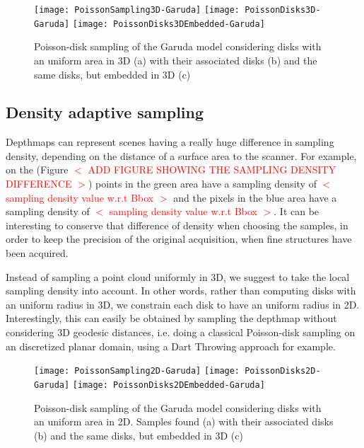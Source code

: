\documentclass[11pt,fleqn]{book} %
\newcommand{\arnaud}[1]{\textcolor{red}{$<$ #1 $>$}}
\begin{document}
\begin{figure}[ht]
\centering
\texttt{[image: PoissonSampling3D-Garuda]}
\texttt{[image: PoissonDisks3D-Garuda]}
\texttt{[image: PoissonDisks3DEmbedded-Garuda]}
\caption{Poisson-disk sampling of the Garuda model considering disks with an uniform area in 3D (a) with their associated disks (b) and the same disks, but embedded in 3D (c)}
\label{fig:poisson_sampling_3d}
\end{figure}

\subsection{Density adaptive sampling}
Depthmaps can represent scenes having a really huge difference in sampling density, depending on the distance of a surface area to the scanner. 
For example, on the (Figure \arnaud{ADD FIGURE SHOWING THE SAMPLING DENSITY DIFFERENCE}) points in the green area have a sampling density of \arnaud{sampling density value w.r.t Bbox} and the pixels in the blue area have a sampling density of \arnaud{sampling density value w.r.t Bbox}. It can be interesting to conserve that difference of density when choosing the samples, in order to keep the precision of the original acquisition, when fine structures have been acquired.

Instead of sampling a point cloud uniformly in 3D, we suggest to take the local sampling density into account. In other words, rather than computing disks with an uniform radius in 3D, we constrain each disk to have an uniform radius in 2D.
Interestingly, this can easily be obtained by sampling the depthmap without considering 3D geodesic distances, i.e. doing a classical Poisson-disk sampling on an discretized planar domain, using a Dart Throwing approach for example.

\begin{figure}[ht]
\centering
\texttt{[image: PoissonSampling2D-Garuda]}
\texttt{[image: PoissonDisks2D-Garuda]}
\texttt{[image: PoissonDisks2DEmbedded-Garuda]}
\caption{Poisson-disk sampling of the Garuda model considering disks with an uniform area in 2D. Samples found (a) with their associated disks (b) and the same disks, but embedded in 3D (c)}
\label{fig:poisson_sampling_2d}
\end{figure}

\end{document}
